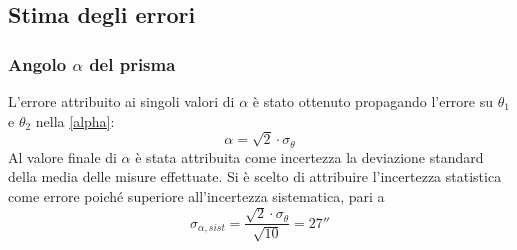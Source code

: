 \documentclass[]{article}
\let\oldsubsection\subsection%
\renewcommand{\subsection}{%
	\renewcommand{\theequation}{\thesubsection.\arabic{equation}}%
	\oldsubsection}%
\begin{document}
    \subsection{Stima degli errori}
    \subsubsection{Angolo $\alpha$ del prisma}
    L'errore attribuito ai singoli valori di $\alpha$ è stato ottenuto propagando l'errore su $\theta_1$ e $\theta_2$ nella \ref{alpha}:
    \begin{equation}
        \label{alpha-err}
        \alpha = \sqrt{2} \cdot \sigma_{\theta} 
    \end{equation}
    Al valore finale di $\alpha$ è stata attribuita come incertezza la deviazione standard della media delle misure effettuate. Si è scelto di attribuire l'incertezza statistica come errore poiché superiore all'incertezza sistematica, pari a
    \begin{equation}
        \label{alpha-err-sist}
        \sigma_{\alpha, sist}= \frac{\sqrt{2} \cdot \sigma_{\theta}}{\sqrt{10}}=27''
    \end{equation}
    \label{par:alpha_err}
\end{document}
